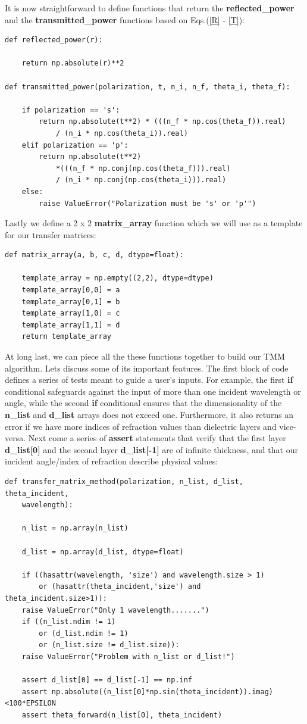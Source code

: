 \documentclass[preprint, onecolumn, amsmath, amssymb, aps]{revtex4-1}
\numberwithin{equation}{section}
\begin{document}
\noindent
It is now straightforward to define functions that return the \textbf{reflected\_power} and the \textbf{transmitted\_power} functions based on Eqs.(\ref{R} - \ref{T}):
\lstset{showspaces=false,showstringspaces=false}%
\begin{lstlisting}
def reflected_power(r):

	return np.absolute(r)**2

def transmitted_power(polarization, t, n_i, n_f, theta_i, theta_f):

	if polarization == 's':
		return np.absolute(t**2) * (((n_f * np.cos(theta_f)).real) 
			/ (n_i * np.cos(theta_i)).real)
	elif polarization == 'p':
		return np.absolute(t**2)
			*(((n_f * np.conj(np.cos(theta_f))).real) 
			/ (n_i * np.conj(np.cos(theta_i))).real)
	else:
		raise ValueError("Polarization must be 's' or 'p'")
\end{lstlisting}
\noindent
Lastly we define a 2 x 2 \textbf{matrix\_array} function which we will use as a template for our transfer matrices:
\lstset{showspaces=false,showstringspaces=false}%
\begin{lstlisting}
def matrix_array(a, b, c, d, dtype=float):

	template_array = np.empty((2,2), dtype=dtype)
	template_array[0,0] = a
	template_array[0,1] = b
	template_array[1,0] = c
	template_array[1,1] = d
	return template_array
\end{lstlisting}
\noindent
At long last, we can piece all the these functions together to build our TMM algorithm. Lets discuss some of its important features. The first block of code defines a series of tests meant to guide a user's inputs. For example, the first \textbf{if} conditional safeguards against the input of more than one incident wavelength or angle, while the second \textbf{if} conditional ensures that the dimensionality of the \textbf{n\_list} and \textbf{d\_list} arrays does not exceed one. Furthermore, it also returns an error if we have more indices of refraction values than dielectric layers and vice-versa. Next come a series of \textbf{assert} statements that verify that the first layer \textbf{d\_list[0]} and the second layer \textbf{d\_list[-1]} are of infinite thickness, and that our incident angle/index of refraction describe physical values: 
\lstset{showspaces=false,showstringspaces=false}%
\begin{lstlisting}
def transfer_matrix_method(polarization, n_list, d_list, theta_incident, 
	wavelength):

	n_list = np.array(n_list)

	d_list = np.array(d_list, dtype=float) 

	if ((hasattr(wavelength, 'size') and wavelength.size > 1)
		or (hasattr(theta_incident,'size') and theta_incident.size>1)):
	raise ValueError("Only 1 wavelength.......")
	if ((n_list.ndim != 1) 
		or (d_list.ndim != 1) 
		or (n_list.size != d_list.size)):
	raise ValueError("Problem with n_list or d_list!")

	assert d_list[0] == d_list[-1] == np.inf
	assert np.absolute((n_list[0]*np.sin(theta_incident)).imag)<100*EPSILON
	assert theta_forward(n_list[0], theta_incident)
\end{lstlisting}
\end{document}

